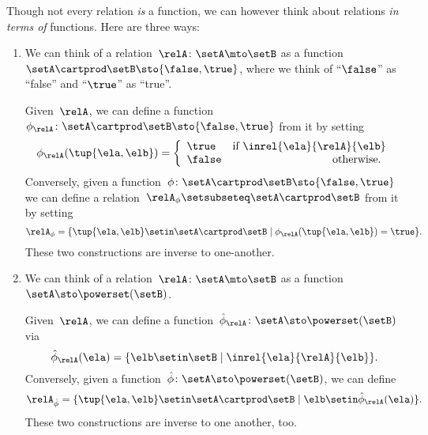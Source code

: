 \label{rem:rel-three-fun-descriptions}
Though not every relation \emph{is} a function, we can however think about relations \emph{in terms of} functions.
Here are three ways:
\begin{enumerate}
    \item We can think of a relation~$\relA \colon \setA \mto\setB$ as a function~$\setA \cartprod \setB \sto \{ \false, \true \}$, where we think of ``$\false$'' as ``false'' and ``$\true$'' as ``true''.

          Given~$\relA$, we can define a function~$\phi_{\relA} \colon \setA \cartprod \setB \sto \{ \false, \true \}$ from it by setting
          \begin{equation*}
              \phi_{\relA}(\tup{\ela, \elb}) =
              \left
              \{\begin{array}{lr}
                  \true  & \text{if } \inrel{\ela}{\relA}{\elb} \\
                  \false & \text{otherwise.
                  }
              \end{array}
              \right.
          \end{equation*}
          Conversely, given a function~$\phi\colon \setA \cartprod \setB \sto \{ \false, \true \}$ we can define a relation~$\relA_{\phi} \setsubseteq \setA \cartprod \setB$ from it by setting
          \begin{equation*}
              \relA_{\phi} = \{ \tup{\ela, \elb} \setin \setA \cartprod \setB \mid \phi_{\relA}(\tup{\ela, \elb}) = \true \}.
          \end{equation*}
          These two constructions are inverse to one-another.

    \item We can think of a relation~$\relA \colon \setA \mto \setB$ as a function~$\setA  \sto \powerset (\setB)$.

          Given~$\relA$, we can define a function~$\hat \phi_{\relA} \colon \setA \sto \powerset (\setB)$ via
          \begin{equation*}
              \hat \phi_{\relA} (\ela) = \{ \elb \setin \setB \mid \inrel{\ela}{\relA}{\elb}\}.
          \end{equation*}
          Conversely, given a function~$\hat \phi \colon \setA \sto \powerset (\setB)$, we can define
          \begin{equation*}
              \relA_{\hat \phi} = \{ \tup{\ela, \elb} \setin \setA \cartprod \setB \mid \elb \setin \hat \phi_{\relA}(\ela)   \}.
          \end{equation*}
          These two constructions are inverse to one another, too.


\end{enumerate}
